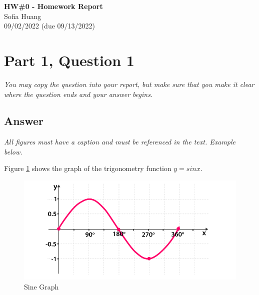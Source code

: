 \documentclass[12pt]{article}
\begin{document}
\begin{centering}
{\large\textbf{HW\#0 - Homework Report}}\\ 
Sofia Huang\\
09/02/2022 (due 09/13/2022)\\
\end{centering}


\section*{Part 1, Question 1}

\emph{You may copy the question into your report, but make sure that you make it clear where the question ends and your answer begins.}

\subsection*{Answer}

\emph{All figures must have a caption and must be referenced in the text. Example below.}

Figure \ref{fig:sine-graph} shows the graph of the trigonometry function \(y = sin x\).

\begin{figure}[h]
    \centering
    \includegraphics[trim=0 20 10 50, clip, width=\textwidth] {Sine-Graph.png}
    \caption{Sine Graph}
    \label{fig:sine-graph}
\end{figure}
\end{document}

